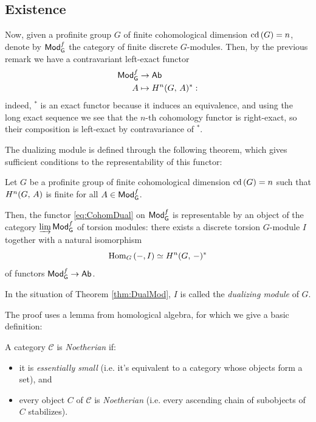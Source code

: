\documentclass[a4paper, oneside]{memoir}
\begin{document}
\subsection{Existence}

Now, given a profinite group \(G\) of finite cohomological dimension \(\operatorname{cd}{(G)}=n\), denote by \(\mathsf{Mod}_{\mathsf{G}}^f\) the category of finite discrete \(G\)-modules.
Then, by the previous remark we have a contravariant left-exact functor
\begin{align}\label{eq:CohomDual}
	\mathsf{Mod}_{\mathsf{G}}^f & \to \mathsf{Ab}                \\
	A      & \mapsto H^{n}( G, \, A )^*:
\end{align}
indeed, \(^*\) is an exact functor because it induces an equivalence, and using the long exact sequence we see that the \(n\)-th cohomology functor is right-exact, so their composition is left-exact by contravariance of \(^*\).

The dualizing module is defined through the following theorem, which gives sufficient conditions to the representability of this functor:

\begin{theorem}\label{thm:DualMod}
	Let \(G\) be a profinite group of finite cohomological dimension \(\operatorname{cd}{(G)}=n\) such that \(H^{n}( G, \, A )\) is finite for all \(A\in\mathsf{Mod}_{\mathsf{G}}^f\).

	Then, the functor \eqref{eq:CohomDual} on \(\mathsf{Mod}_{\mathsf{G}}^f\) is representable by an object of the category \(\varinjlim\mathsf{Mod}_{\mathsf{G}}^f\) of torsion modules: there exists a discrete torsion \(G\)-module \(I\) together with a natural isomorphism
	\begin{equation}\label{eq:FuncIso}
		\operatorname{Hom}_G\left( -,I \right) \simeq H^{n}( G, \, - )^*
	\end{equation}
	of functors \(\mathsf{Mod}_{\mathsf{G}}^f\to\mathsf{Ab}\).
\end{theorem}

\begin{definition}
	In the situation of Theorem \ref{thm:DualMod}, \(I\) is called the \textit{dualizing module} of \(G\).
\end{definition}

The proof uses a lemma from homological algebra, for which we give a basic definition:

\begin{definition}
	A category \(\mathcal{C}\) is \textit{Noetherian} if:
	\begin{itemize}
		\item it is \textit{essentially small} (i.e. it's equivalent to a category whose objects form a set), and
		\item every object \(C\) of \(\mathcal{C}\) is \textit{Noetherian} (i.e. every ascending chain of subobjects of \(C\) stabilizes).
	\end{itemize}
\end{definition}
\end{document}

